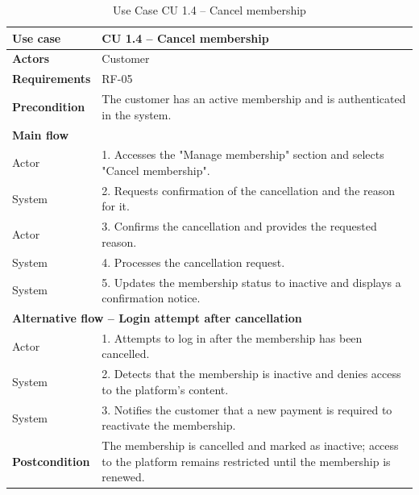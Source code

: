 \documentclass{article}
\begin{document}
\begin{table}[H]
\centering
\small
\renewcommand{\arraystretch}{1.35}
\caption{Use Case CU 1.4 -- Cancel membership}
\label{tab:cu1.4}
\begin{tabularx}{\textwidth}{|l|X|}
\hline
\textbf{Use case} & CU 1.4 -- Cancel membership \\ \hline
\textbf{Actors} & Customer \\ \hline
\textbf{Requirements} & RF-05 \\ \hline
\textbf{Precondition} & The customer has an active membership and is authenticated in the system. \\ \hline
\multicolumn{2}{|l|}{\textbf{Main flow}} \\ \hline
Actor & 1. Accesses the "Manage membership" section and selects "Cancel membership". \\ \hline
System & 2. Requests confirmation of the cancellation and the reason for it. \\ \hline
Actor & 3. Confirms the cancellation and provides the requested reason. \\ \hline
System & 4. Processes the cancellation request. \\ \hline
System & 5. Updates the membership status to inactive and displays a confirmation notice. \\ \hline
\multicolumn{2}{|l|}{\textbf{Alternative flow -- Login attempt after cancellation}} \\ \hline
Actor & 1. Attempts to log in after the membership has been cancelled. \\ \hline
System & 2. Detects that the membership is inactive and denies access to the platform's content. \\ \hline
System & 3. Notifies the customer that a new payment is required to reactivate the membership. \\ \hline
\textbf{Postcondition} & The membership is cancelled and marked as inactive; access to the platform remains restricted until the membership is renewed. \\ \hline
\end{tabularx}
\end{table}
\end{document}
